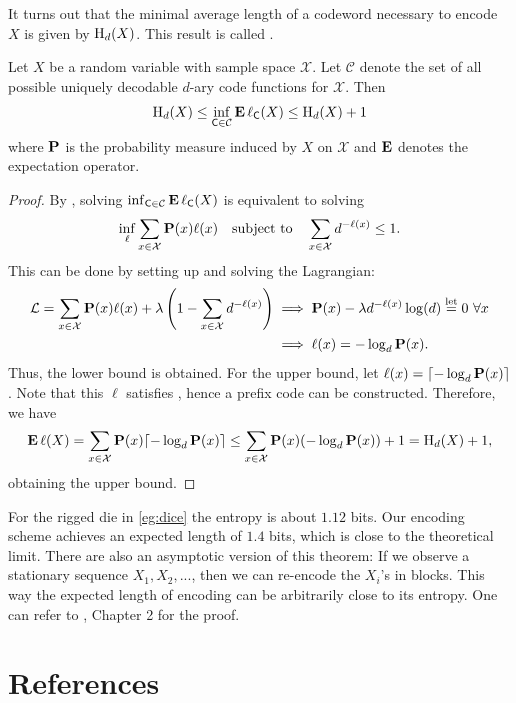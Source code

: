 \documentclass[a4paper]{article}
\begin{document}
\begin{remark}
	It turns out that the minimal average length of a codeword necessary to encode $X$ is given by $\mathrm{H}_d(X)$.
	This result is called .
\end{remark}

\begin{theorem}\label{thm:shannon-source-coding}
	Let $X$ be a random variable with sample space $\mathcal{X}$.
	Let $\mathcal{C}$ denote the set of all possible uniquely decodable $d$-ary code functions for $\mathcal{X}$.
	Then
	\begin{align*}
		\mathrm{H}_d(X)
		\leq \inf_{\mathsf{C}\in\mathcal{C}} \operatorname{\text{\textrm{\upshape\textbf{E}}}} \ell_{\mathsf{C}}(X)
		\leq \mathrm{H}_d(X) + 1
	\end{align*}
	where $\operatorname{\text{\textrm{\upshape\textbf{P}}}}$ is the probability measure induced by $X$ on $\mathcal{X}$
	and $\operatorname{\text{\textrm{\upshape\textbf{E}}}}$ denotes the expectation operator.
\end{theorem}
\begin{proof}
	By ,
	solving $\inf_{\mathsf{C}\in\mathcal{C}}\operatorname{\text{\textrm{\upshape\textbf{E}}}}\ell_{\mathsf{C}}(X)$ is equivalent to solving
	\begin{align*}
		\inf_{\ell} \sum_{x\in\mathcal{X}} \operatorname{\text{\textrm{\upshape\textbf{P}}}}(x) \ell(x)
		\quad\text{subject to}\quad
		\sum_{x\in\mathcal{X}} d^{-\ell(x)} \leq 1.
	\end{align*}
	This can be done by setting up and solving the Lagrangian:
	\begin{align*}
		\mathcal{L} = \sum_{x\in\mathcal{X}} \pr(x)\ell(x) + \lambda \left(1-\sum_{x\in\mathcal{X}}d^{-\ell(x)}\right)
		&\implies \pr(x) - \lambda d^{-\ell(x)}\log(d) \leteq 0\ \forall x \\
		&\implies \ell(x) = -\log_d \pr(x).
	\end{align*}
	Thus, the lower bound is obtained.
	For the upper bound, let $\ell(x)=\lceil-\log_d\operatorname{\text{\textrm{\upshape\textbf{P}}}}(x)\rceil$.
	Note that this $\ell$ satisfies ,
	hence a prefix code can be constructed.
	Therefore, we have
	\begin{align*}
		\operatorname{\text{\textrm{\upshape\textbf{E}}}}\ell(X)
		= \sum_{x\in\mathcal{X}} \operatorname{\text{\textrm{\upshape\textbf{P}}}}(x) \lceil-\log_d\operatorname{\text{\textrm{\upshape\textbf{P}}}}(x)\rceil
		\leq \sum_{x\in\mathcal{X}} \operatorname{\text{\textrm{\upshape\textbf{P}}}}(x) (-\log_{d}\operatorname{\text{\textrm{\upshape\textbf{P}}}}(x)) + 1
		= \mathrm{H}_d(X) + 1,
	\end{align*}
	obtaining the upper bound.
\end{proof}

\begin{remark}
	For the rigged die in \autoref{eg:dice}
	the entropy is about $1.12$ bits.
	Our encoding scheme achieves an expected length of $1.4$ bits,
	which is close to the theoretical limit.
	There are also an asymptotic version of this theorem:
	If we observe a stationary sequence $X_1,X_2,...$,
	then we can re-encode the $X_i$'s in blocks.
	This way the expected length of encoding can be arbitrarily close to its entropy.
	One can refer to \textcite{duchi-2023}, Chapter 2 for the proof.
\end{remark}

\vfill
\printglossaries
\section*{References}
\printbibliography[heading=none]
\end{document}
